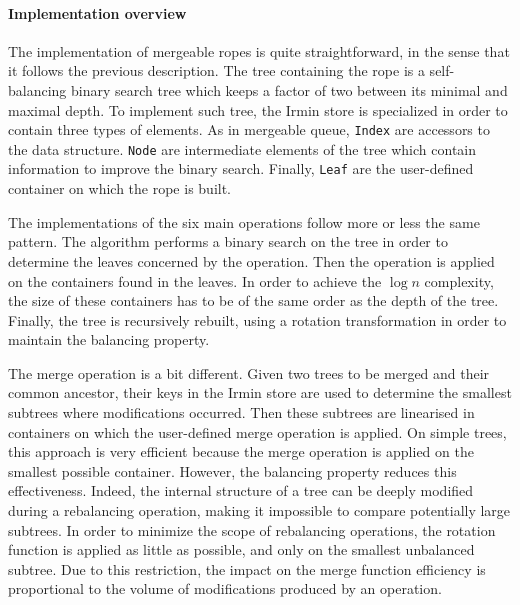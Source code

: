 \documentclass{article}
\newcommand{\irmin}{Irmin\xspace}
\newcommand{\code}[1]{\texttt{#1}}
\begin{document}

\paragraph{Implementation overview}
The implementation of mergeable ropes is quite straightforward, in the sense that it follows the previous description.
The tree containing the rope is a self-balancing binary search tree which keeps a factor of two between its minimal and maximal depth.
To implement such tree, the \irmin store is specialized in order to contain three types of elements.
As in mergeable queue, \code{Index} are accessors to the data structure.
\code{Node} are intermediate elements of the tree which contain information to improve the binary search.
Finally, \code{Leaf} are the user-defined container on which the rope is built.

The implementations of the six main operations follow more or less the same pattern.
The algorithm performs a binary search on the tree in order to determine the leaves concerned by the operation.
Then the operation is applied on the containers found in the leaves.
In order to achieve the $\log n$ complexity, the size of these containers has to be of the same order as the depth of the tree.
Finally, the tree is recursively rebuilt, using a rotation transformation in order to maintain the balancing property.

The merge operation is a bit different.
Given two trees to be merged and their common ancestor, their keys in the \irmin store are used to determine the smallest subtrees where modifications occurred.
Then these subtrees are linearised in containers on which the user-defined merge operation is applied.
On simple trees, this approach is very efficient because the merge operation is applied on the smallest possible container.
However, the balancing property reduces this effectiveness.
Indeed, the internal structure of a tree can be deeply modified during a rebalancing operation, making it impossible to compare potentially large subtrees.
In order to minimize the scope of rebalancing operations, the rotation function is applied as little as possible, and only on the smallest unbalanced subtree.
Due to this restriction, the impact on the merge function efficiency is proportional to the volume of modifications produced by  an operation.
\end{document}
